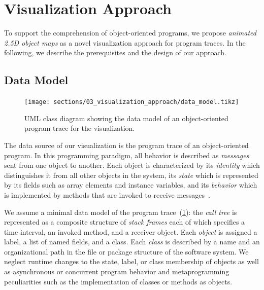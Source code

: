 \section{Visualization Approach}
\label{sec:visualization_approach}

To support the comprehension of object-oriented programs, we propose \emph{animated 2.5D object maps} as a novel visualization approach for program traces.
In the following, we describe the prerequisites and the design of our approach.

\subsection{Data Model}
\label{sec:visualization_approach/data_model}

\begin{figure}
	\texttt{[image: sections/03\_visualization\_approach/data\_model.tikz]}
	\caption{UML class diagram showing the data model of an object-oriented program trace for the visualization.}
	\label{fig:visualization_approach/data_model}
\end{figure}

The data source of our visualization is the program trace of an object-oriented program.
In this programming paradigm, all behavior is described as \emph{messages} sent from one object to another.
Each object is characterized by its \emph{identity} which distinguishes it from all other objects in the system, its \emph{state} which is represented by its fields such as array elements and instance variables, and its \emph{behavior} which is implemented by methods that are invoked to receive messages~\cite{thiede2023time}.

We assume a minimal data model of the program trace~(\cref{fig:visualization_approach/data_model}):
the \emph{call tree} is represented as a composite structure of \emph{stack frames} each of which specifies a time interval, an invoked method, and a receiver object.
Each \emph{object} is assigned a label, a list of named fields, and a class.
Each \emph{class} is described by a name and an organizational path in the file or package structure of the software system.
We neglect runtime changes to the state, label, or class membership of objects as well as asynchronous or concurrent program behavior and metaprogramming peculiarities such as the implementation of classes or methods as objects.

